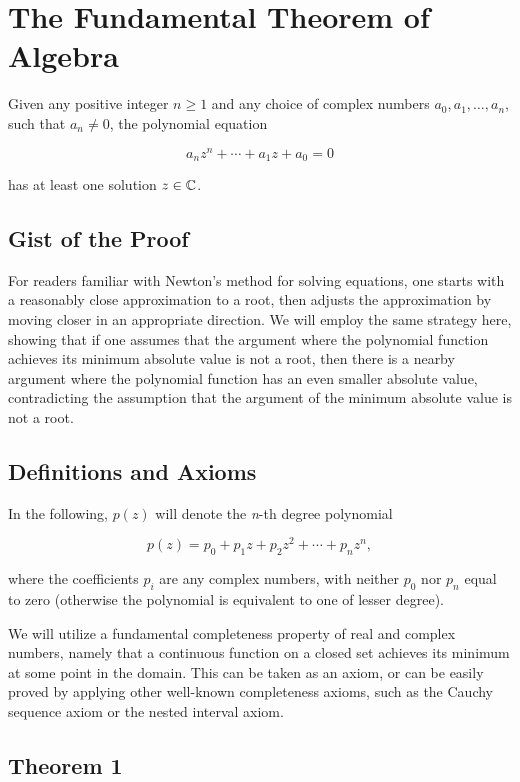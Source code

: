 \newpage
\section{The Fundamental Theorem of Algebra}

Given any positive integer \(n \geq 1\) and any choice of complex numbers \(a_0, a_1, \ldots, a_n\), 
such that \(a_n \neq 0\), the polynomial equation

\[
	a_n z^n + \cdots + a_1 z + a_0 = 0 
\]

has at least one solution \(z \in \mathbb{C}\).

\subsection{Gist of the Proof}

For readers familiar with Newton’s method for solving equations, one starts with a reasonably close 
approximation to a root, then adjusts the approximation by moving closer in an appropriate direction. 
We will employ the same strategy here, showing that if one assumes that the argument where the polynomial 
function achieves its minimum absolute value is not a root, then there is a nearby argument where the 
polynomial function has an even smaller absolute value, contradicting the assumption that the argument of 
the minimum absolute value is not a root.

\subsection{Definitions and Axioms}

In the following, \(p(z)\) will denote the \emph{n}-th degree polynomial

\[
	p(z) = p_0 + p_1 z + p_2 z^2 + \cdots + p_n z^n,
\]

where the coefficients \(p_i\) are any complex numbers, with neither \(p_0\) nor \(p_n\) equal to zero 
(otherwise the polynomial is equivalent to one of lesser degree).

We will utilize a fundamental completeness property of real and complex numbers, namely that a continuous 
function on a closed set achieves its minimum at some point in the domain. This can be taken as an axiom, 
or can be easily proved by applying other well-known completeness axioms, such as the Cauchy sequence 
axiom or the nested interval axiom.

\subsection{Theorem 1}

